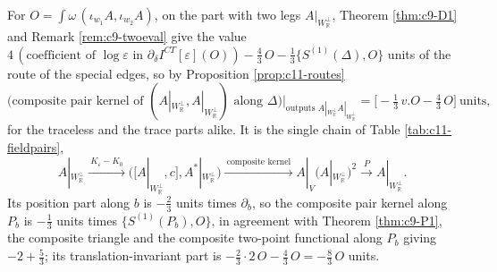\begin{example}
\label{ex:c11-bilinear}
For $O=\int\omega\,(\iota_{w_1}A,\iota_{w_2}A)$, on the part with two legs $A|_{W_{\mathbb R}^\perp}$, Theorem \ref{thm:c9-D1} and Remark \ref{rem:c9-twoeval} give the value $4\,(\text{coefficient of }\log\varepsilon\text{ in }\partial_\delta I^{CT}[\varepsilon](O))-\tfrac43\,O-\tfrac13\{S^{(1)}(\Delta),O\}$ units of the route of the special edges, so by Proposition \ref{prop:c11-routes}
\[
\big(\text{composite pair kernel of }(A|_{W_{\mathbb R}^\perp},A|_{W_{\mathbb R}^\perp})\text{ along }\Delta\big)\Big|_{\text{outputs }A|_{W_{\mathbb R}^\perp}A|_{W_{\mathbb R}^\perp}}=\Big[-\tfrac13\,v.O-\tfrac43\,O\Big]\ \text{units},
\]
for the traceless and the trace parts alike. It is the single chain of Table \ref{tab:c11-fieldpairs},
\[
A|_{W_{\mathbb R}^\perp}\xrightarrow{\ K_\varepsilon-K_0\ }\big([A|_{W_{\mathbb R}^\perp},c],A^*|_{W_{\mathbb R}^\perp}\big)\xrightarrow{\ \text{composite kernel}\ }A|_V(A|_{W_{\mathbb R}^\perp})^2\xrightarrow{\ P\ }A|_{W_{\mathbb R}^\perp}.
\]
Its position part along $b$ is $-\tfrac23$ units times $\partial_b$, so the composite pair kernel along $P_b$ is $-\tfrac13$ units times $\{S^{(1)}(P_b),O\}$, in agreement with Theorem \ref{thm:c9-P1}, the composite triangle and the composite two-point functional along $P_b$ giving $-2+\tfrac53$; its translation-invariant part is $-\tfrac23\cdot2\,O-\tfrac43\,O=-\tfrac83\,O$ units.
\end{example}

